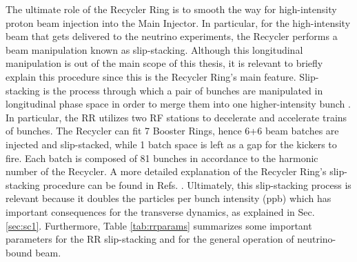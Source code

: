 The ultimate role of the Recycler Ring is to smooth the way for high-intensity proton beam injection into the Main Injector. In particular, for the high-intensity beam that gets delivered to the neutrino experiments, the Recycler performs a beam manipulation known as slip-stacking. Although this longitudinal manipulation is out of the main scope of this thesis, it is relevant to briefly explain this procedure since this is the Recycler Ring's main feature. Slip-stacking is the process through which a pair of bunches are manipulated in longitudinal phase space in order to merge them into one higher-intensity bunch \cite{fermi_rookie}. In particular, the RR utilizes two RF stations to decelerate and accelerate trains of bunches. The Recycler can fit 7 Booster Rings, hence 6+6 beam batches are injected and slip-stacked, while 1 batch space is left as a gap for the kickers to fire. Each batch is composed of 81 bunches in accordance to the harmonic number of the Recycler. A more detailed explanation of the Recycler Ring's slip-stacking procedure can be found in Refs. \cite{rr1,rr2,fermi_rookie}. Ultimately, this slip-stacking process is relevant because it doubles the particles per bunch intensity (ppb) which has important consequences for the transverse dynamics, as explained in Sec. \ref{sec:sc1}. Furthermore, Table \ref{tab:rrparams} summarizes some important parameters for the RR slip-stacking and for the general operation of neutrino-bound beam.     

